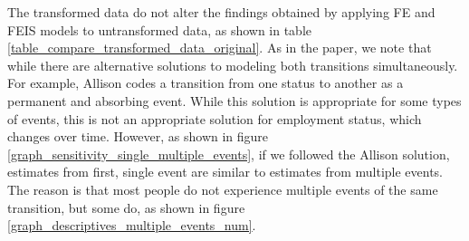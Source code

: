 The transformed data do not alter the findings obtained by applying FE and FEIS models to untransformed data, as shown in table \ref{table_compare_transformed_data_original}.  As in the paper, we note that while there are alternative solutions to modeling both transitions simultaneously.  For example, Allison \citeyearpar{allison_asymmetric_2019} codes a transition from one status to another as a permanent and absorbing event.  While this solution is appropriate for some types of events, this is not an appropriate solution for employment status, which changes over time.  However, as shown in figure \ref{graph_sensitivity_single_multiple_events}, if we followed the Allison solution, estimates from first, single event are similar to estimates from multiple events.  The reason is that most people do not experience multiple events of the same transition, but some do, as shown in figure \ref{graph_descriptives_multiple_events_num}.  


